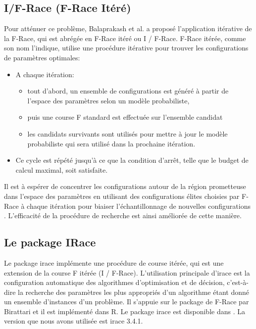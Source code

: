 \documentclass[12pt]{article}
\begin{document}
        \subsection{I/F-Race (F-Race Itéré)} 
            Pour atténuer ce problème, Balaprakash et al. \cite{balaprakash2007improvement} a proposé l'application itérative de la F-Race, qui est abrégée en F-Race itéré ou I / F-Race.
            F-Race itérée, comme son nom l'indique, utilise une procédure itérative pour trouver les configurations de paramètres optimales:
            \begin{itemize}
                \item A chaque itération:
                    \begin{itemize}
                        \item tout d'abord, un ensemble de configurations est généré à partir de l’espace des paramètres selon un modèle probabiliste,
                        \item puis une course F standard est effectuée sur l'ensemble candidat 
                        \item les candidats survivants sont utilisés pour mettre à jour le modèle probabiliste qui sera utilisé dans la prochaine itération.
                    \end{itemize}
                \item Ce cycle est répété jusqu'à ce que la condition d'arrêt, telle que le budget de calcul maximal, soit satisfaite.
            \end{itemize}
            Il est à espérer de concentrer les configurations autour de la région prometteuse dans l’espace des paramètres en utilisant des configurations élites choisies par F-Race à chaque itération pour biaiser l'échantillonnage de nouvelles configurations \cite{birattari2009f}.  L'efficacité de la procédure de recherche est ainsi améliorée de cette manière.
        \subsection{Le package IRace}
        Le package irace implémente une procédure de course itérée, qui est une extension de la course F itérée (I / F-Race). L'utilisation principale d'irace est la configuration automatique des algorithmes d'optimisation et de décision, c'est-à-dire la recherche des paramètres les plus appropriés d'un algorithme étant donné un ensemble d’instances d'un problème. Il s'appuie sur le package de F-Race par Birattari et il est implémenté dans R. Le package irace est disponible dans \cite{lopez2016irace}.
        La version que nous avons utilisée est irace 3.4.1.
\end{document}
